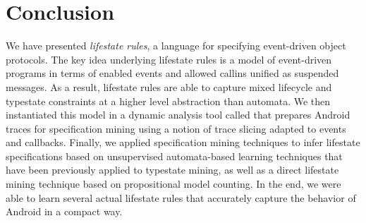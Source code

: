 \documentclass[10pt,reprint,nocopyrightspace,numbers]{sigplanconf}
\begin{document}


\section{Conclusion}
\label{sec:conclusion}

We have presented \emph{lifestate rules}, a language for specifying event-driven object protocols.
The key idea underlying lifestate rules is a model of event-driven programs in terms of enabled events and allowed callins unified as suspended messages.
As a result, lifestate rules are able to capture mixed lifecycle and typestate constraints at a higher level abstraction than automata.
We then instantiated this model in a dynamic analysis tool called \toolname{} that prepares Android traces for specification mining
using a notion of trace slicing adapted to events and callbacks.
Finally, we applied specification mining techniques to infer lifestate specifications based on unsupervised automata-based learning techniques that have been previously applied to typestate mining, as well as a direct lifestate mining technique based on propositional model counting.
In the end, we were able to learn several actual lifestate rules that
accurately capture the behavior of Android in a compact way.









%


%
%

\end{document}
